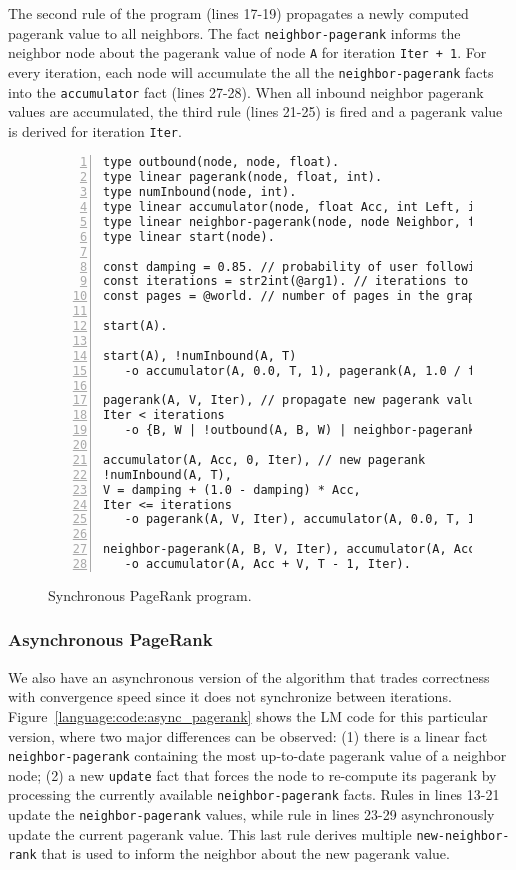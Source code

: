 The second rule of the program (lines 17-19) propagates a newly computed
pagerank value to all neighbors. The fact \texttt{neighbor-pagerank} informs the
neighbor node about the pagerank value of node \texttt{A} for iteration
\texttt{Iter + 1}. For every iteration, each node will accumulate the all the
\texttt{neighbor-pagerank} facts into the \texttt{accumulator} fact (lines
27-28). When all inbound neighbor pagerank values are accumulated, the third
rule (lines 21-25) is fired and a pagerank value is derived for iteration
\texttt{Iter}.

\begin{figure}[h!]
\begin{Verbatim}[numbers=left,fontsize=\scriptsize]
type outbound(node, node, float).
type linear pagerank(node, float, int).
type numInbound(node, int).
type linear accumulator(node, float Acc, int Left, int Iteration).
type linear neighbor-pagerank(node, node Neighbor, float Rank, int Iteration).
type linear start(node).

const damping = 0.85. // probability of user following a link in the current page.
const iterations = str2int(@arg1). // iterations to compute.
const pages = @world. // number of pages in the graph.

start(A).

start(A), !numInbound(A, T)
   -o accumulator(A, 0.0, T, 1), pagerank(A, 1.0 / float(pages), 0).

pagerank(A, V, Iter), // propagate new pagerank value
Iter < iterations
   -o {B, W | !outbound(A, B, W) | neighbor-pagerank(B, A, V * W, Iter + 1)}.

accumulator(A, Acc, 0, Iter), // new pagerank
!numInbound(A, T),
V = damping + (1.0 - damping) * Acc,
Iter <= iterations
   -o pagerank(A, V, Iter), accumulator(A, 0.0, T, Iter + 1).
	
neighbor-pagerank(A, B, V, Iter), accumulator(A, Acc, T, Iter)
   -o accumulator(A, Acc + V, T - 1, Iter).
\end{Verbatim}
\caption{Synchronous PageRank program.}
\label{language:code:pagerank}
\end{figure}

\subsubsection{Asynchronous PageRank}

We also have an asynchronous version of the algorithm that trades correctness
with convergence speed since it does not synchronize between iterations.
Figure~\ref{language:code:async_pagerank} shows the LM code for this particular
version, where two major differences can be observed: (1) there is a linear fact
\texttt{neighbor-pagerank} containing the most up-to-date pagerank value of a
neighbor node; (2) a new \texttt{update} fact that forces the node to re-compute
its pagerank by processing the currently available \texttt{neighbor-pagerank}
facts. Rules in lines 13-21 update the \texttt{neighbor-pagerank} values, while
rule in lines 23-29 asynchronously update the current pagerank value. This last
rule derives multiple \texttt{new-neighbor-rank} that is used to inform the
neighbor about the new pagerank value.

